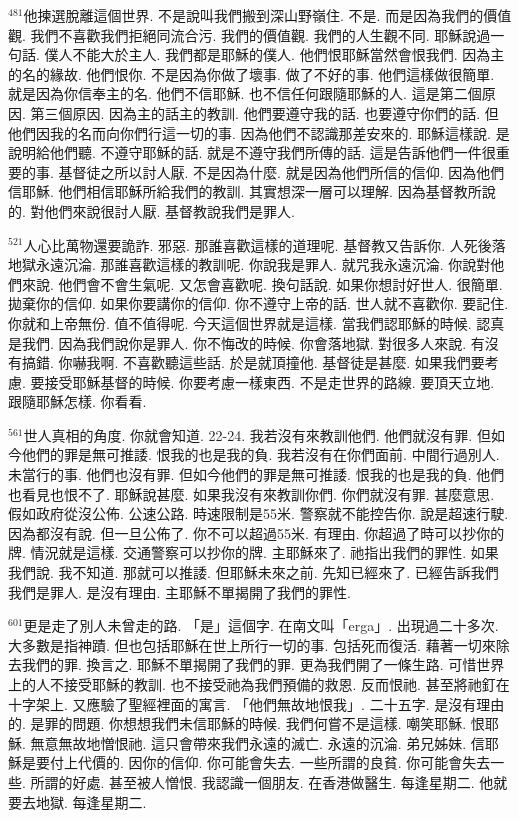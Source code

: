 \documentclass{book}
\begin{document}
$^{481}$他揀選脫離這個世界.
不是說叫我們搬到深山野嶺住.
不是.
而是因為我們的價值觀.
我們不喜歡我們拒絕同流合污.
我們的價值觀.
我們的人生觀不同.
耶穌說過一句話.
僕人不能大於主人.
我們都是耶穌的僕人.
他們恨耶穌當然會恨我們.
因為主的名的緣故.
他們恨你.
不是因為你做了壞事.
做了不好的事.
他們這樣做很簡單.
就是因為你信奉主的名.
他們不信耶穌.
也不信任何跟隨耶穌的人.
這是第二個原因.
第三個原因.
因為主的話主的教訓.
他們要遵守我的話.
也要遵守你們的話.
但他們因我的名而向你們行這一切的事.
因為他們不認識那差安來的.
耶穌這樣說.
是說明給他們聽.
不遵守耶穌的話.
就是不遵守我們所傳的話.
這是告訴他們一件很重要的事.
基督徒之所以討人厭.
不是因為什麼.
就是因為他們所信的信仰.
因為他們信耶穌.
他們相信耶穌所給我們的教訓.
其實想深一層可以理解.
因為基督教所說的.
對他們來說很討人厭.
基督教說我們是罪人.

$^{521}$人心比萬物還要詭詐.
邪惡.
那誰喜歡這樣的道理呢.
基督教又告訴你.
人死後落地獄永遠沉淪.
那誰喜歡這樣的教訓呢.
你說我是罪人.
就咒我永遠沉淪.
你說對他們來說.
他們會不會生氣呢.
又怎會喜歡呢.
換句話說.
如果你想討好世人.
很簡單.
拋棄你的信仰.
如果你要講你的信仰.
你不遵守上帝的話.
世人就不喜歡你.
要記住.
你就和上帝無份.
值不值得呢.
今天這個世界就是這樣.
當我們認耶穌的時候.
認真是我們.
因為我們說你是罪人.
你不悔改的時候.
你會落地獄.
對很多人來說.
有沒有搞錯.
你嚇我啊.
不喜歡聽這些話.
於是就頂撞他.
基督徒是甚麼.
如果我們要考慮.
要接受耶穌基督的時候.
你要考慮一樣東西.
不是走世界的路線.
要頂天立地.
跟隨耶穌怎樣.
你看看.

$^{561}$世人真相的角度.
你就會知道.
22-24.
我若沒有來教訓他們.
他們就沒有罪.
但如今他們的罪是無可推諉.
恨我的也是我的負.
我若沒有在你們面前.
中間行過別人.
未當行的事.
他們也沒有罪.
但如今他們的罪是無可推諉.
恨我的也是我的負.
他們也看見也恨不了.
耶穌說甚麼.
如果我沒有來教訓你們.
你們就沒有罪.
甚麼意思.
假如政府從沒公佈.
公速公路.
時速限制是55米.
警察就不能控告你.
說是超速行駛.
因為都沒有說.
但一旦公佈了.
你不可以超過55米.
有理由.
你超過了時可以抄你的牌.
情況就是這樣.
交通警察可以抄你的牌.
主耶穌來了.
祂指出我們的罪性.
如果我們說.
我不知道.
那就可以推諉.
但耶穌未來之前.
先知已經來了.
已經告訴我們我們是罪人.
是沒有理由.
主耶穌不單揭開了我們的罪性.

$^{601}$更是走了別人未曾走的路.
「是」這個字.
在南文叫「erga」.
出現過二十多次.
大多數是指神蹟.
但也包括耶穌在世上所行一切的事.
包括死而復活.
藉著一切來除去我們的罪.
換言之.
耶穌不單揭開了我們的罪.
更為我們開了一條生路.
可惜世界上的人不接受耶穌的教訓.
也不接受祂為我們預備的救恩.
反而恨祂.
甚至將祂釘在十字架上.
又應驗了聖經裡面的寓言.
「他們無故地恨我」.
二十五字.
是沒有理由的.
是罪的問題.
你想想我們未信耶穌的時候.
我們何嘗不是這樣.
嘲笑耶穌.
恨耶穌.
無意無故地憎恨祂.
這只會帶來我們永遠的滅亡.
永遠的沉淪.
弟兄姊妹.
信耶穌是要付上代價的.
因你的信仰.
你可能會失去.
一些所謂的良貧.
你可能會失去一些.
所謂的好處.
甚至被人憎恨.
我認識一個朋友.
在香港做醫生.
每逢星期二.
他就要去地獄.
每逢星期二.
\end{document}
